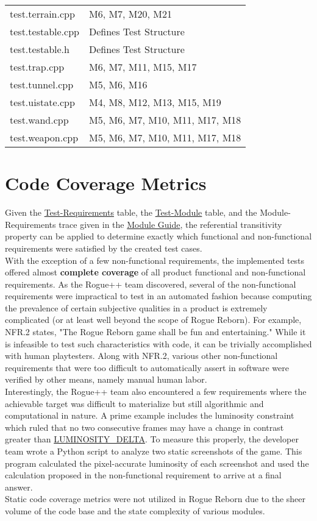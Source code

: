 \documentclass[12pt, titlepage]{article}
\newcommand{\newsection}[1]{\newpage\section{#1}}
\newcommand{\tplink}[1]{\href{run:../TestPlan/TestPlan.pdf}{#1}}
\begin{document}
\begin{table}[H]
\begin{tabular}{p{} R{0.90\textwidth}}
            test.terrain.cpp        & M6, M7, M20, M21\\
            test.testable.cpp       & Defines Test Structure\\
            test.testable.h         & Defines Test Structure\\
            test.trap.cpp           & M6, M7, M11, M15, M17\\
            test.tunnel.cpp         & M5, M6, M16\\
            test.uistate.cpp        & M4, M8, M12, M13, M15, M19\\
            test.wand.cpp           & M5, M6, M7, M10, M11, M17, M18\\
            test.weapon.cpp         & M5, M6, M7, M10, M11, M17, M18\\
			\hline
		\end{tabular}
	\end{table}

\newsection{Code Coverage Metrics} \label{Section_Metrics}
	Given the \hyperref[TblMH]{Test-Requirements} table, the \hyperref[TblTMT]{Test-Module} table, and the Module-Requirements trace given in the \href{run:../MG/MG.pdf}{Module Guide}, the referential transitivity property can be applied to determine exactly which functional and non-functional requirements were satisfied by the created test cases.\\

	With the exception of a few non-functional requirements, the implemented tests offered almost \textbf{complete coverage} of all product functional and non-functional requirements.  As the Rogue++ team discovered, several of the non-functional requirements were impractical to test in an automated fashion because computing the prevalence of certain subjective qualities in a product is extremely complicated (or at least well beyond the scope of Rogue Reborn). For example, NFR.2 states, "The Rogue Reborn game shall be fun and entertaining." While it is infeasible to test such characteristics with code, it can be trivially accomplished with human playtesters.  Along with NFR.2, various other non-functional requirements that were too difficult to automatically assert in software were verified by other means, namely manual human labor.\\

	Interestingly, the Rogue++ team also encountered a few requirements where the achievable target was difficult to materialize but still algorithmic and computational in nature.  A prime example includes the luminosity constraint which ruled that no two consecutive frames may have a change in contrast greater than \tplink{LUMINOSITY\_DELTA}.  To measure this properly, the developer team wrote a Python script to analyze two static screenshots of the game.  This program calculated the pixel-accurate luminosity of each screenshot and used the calculation proposed in the non-functional requirement to arrive at a final answer.\\

	Static code coverage metrics were not utilized in Rogue Reborn due to the sheer volume of the code base and the state complexity of various modules.

\newpage


\end{document}
